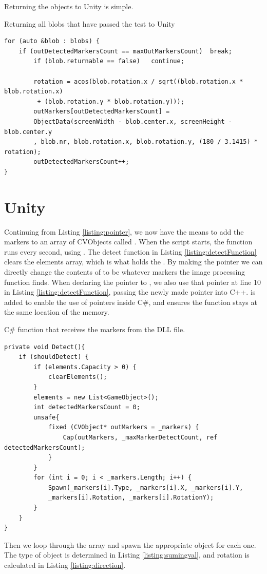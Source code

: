 Returning the objects to Unity is simple. 
 \begin{listing}[H]
	\caption{Returning all blobs that have passed the test to Unity}
	\begin{verbatim}
for (auto &blob : blobs) {
	if (outDetectedMarkersCount == maxOutMarkersCount)	break;
		if (blob.returnable == false)	continue;
		
		rotation = acos(blob.rotation.x / sqrt((blob.rotation.x * blob.rotation.x)
		 + (blob.rotation.y * blob.rotation.y)));
		outMarkers[outDetectedMarkersCount] = 
		ObjectData(screenWidth - blob.center.x, screenHeight - blob.center.y
		, blob.nr, blob.rotation.x, blob.rotation.y, (180 / 3.1415) * rotation);
		outDetectedMarkersCount++;
}
	\end{verbatim}
	\label{listing:return}
\end{listing}


\section{Unity}
	Continuing from Listing \ref{listing:pointer}, we now have the means to add the markers to an array of CVObjects called . When the script starts, the  function runs every second, using . The detect function in Listing \ref{listing:detectFunction} clears the elements array, which is what holds the . By making the pointer  we can directly change the contents of  to be whatever markers the image processing function finds. When declaring the pointer to , we also use that pointer at line 10 in Listing \ref{listing:detectFunction}, passing the newly made pointer into C++.  is added to enable the use of pointers inside C\#, and  ensures the function stays at the same location of the memory.
	\begin{listing}[H]
		\caption{C\# function that receives the markers from the DLL file.}
		\begin{verbatim}
private void Detect(){
	if (shouldDetect) {
		if (elements.Capacity > 0) {
			clearElements();
		}
		elements = new List<GameObject>();
		int detectedMarkersCount = 0;
		unsafe{
			fixed (CVObject* outMarkers = _markers) {
				Cap(outMarkers, _maxMarkerDetectCount, ref detectedMarkersCount);
			}
		}
		for (int i = 0; i < _markers.Length; i++) {
			Spawn(_markers[i].Type, _markers[i].X, _markers[i].Y,
			_markers[i].Rotation, _markers[i].RotationY);
		}
	}
}
	\end{verbatim}
\label{listing:detectFunction}
\end{listing}
Then we loop through the  array and spawn the appropriate object for each one. The type of object is determined in Listing \ref{listing:sumingval}, and rotation is calculated in Listing \ref{listing:direction}.\\

